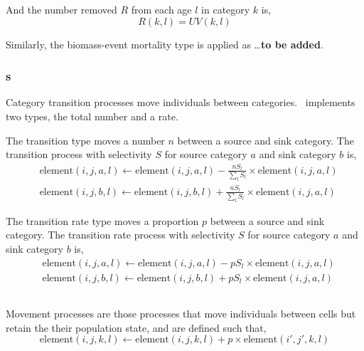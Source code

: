 And the number removed $R$ from each age $l$ in category $k$ is,
\begin{equation}
  R(k,l) = UV(k,l)
\end{equation}

Similarly, the biomass-event mortality type is applied as \ldots \textbf{to be added}.

\subsubsection{s}

Category transition processes move individuals between categories. \SPM\ implements two types, the total number and a rate. 

The transition type moves a number $n$ between a source and sink category. The transition process with selectivity $S$ for source category $a$ and sink category $b$ is,
\begin{equation}\begin{split}
  & \text{element}(i,j,a,l) \leftarrow \text{element}(i,j,a,l) - \frac{nS_l}{\sum\limits_l S_l} \times \text{element}(i,j,a,l) \\
  & \text{element}(i,j,b,l) \leftarrow \text{element}(i,j,b,l) + \frac{nS_l}{\sum\limits_l S_l} \times \text{element}(i,j,a,l)
\end{split}\end{equation}

The transition rate type moves a proportion $p$ between a source and sink category. The transition rate process with selectivity $S$ for source category $a$ and sink category $b$ is,
\begin{equation}\begin{split}
  & \text{element}(i,j,a,l) \leftarrow \text{element}(i,j,a,l) - pS_l \times \text{element}(i,j,a,l) \\
  & \text{element}(i,j,b,l) \leftarrow \text{element}(i,j,b,l) + pS_l \times \text{element}(i,j,a,l)
\end{split}\end{equation}

\subsection{}

Movement processes are those processes that move individuals between cells but retain the their population state, and are defined such that,
\begin{equation}
\text{element}(i,j,k,l)\leftarrow \text{element}(i,j,k,l) + p \times \text{element}(i',j',k,l)
\end{equation}

